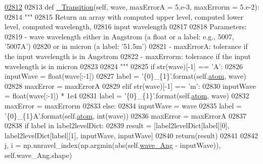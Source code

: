 \begin{DoxyCode}
\hypertarget{classpyneb_1_1core_1_1pynebcore_1_1_rec_atom_l02812}{}\hyperlink{classpyneb_1_1core_1_1pynebcore_1_1_rec_atom_a32b31a371f3b6ecc5bbbc4d0c5d2a855}{02812} 
02813     \textcolor{keyword}{def }\hyperlink{classpyneb_1_1core_1_1pynebcore_1_1_rec_atom_a32b31a371f3b6ecc5bbbc4d0c5d2a855}{\_Transition}(self, wave, maxErrorA = 5.e-3, maxErrorm = 5.e-2):
02814         \textcolor{stringliteral}{"""}
02815 \textcolor{stringliteral}{        Return an array with computed upper level, computed lower level, computed wavelength, }
02816 \textcolor{stringliteral}{            input wavelength}
02817 \textcolor{stringliteral}{        }
02818 \textcolor{stringliteral}{        Parameters:}
02819 \textcolor{stringliteral}{            - wave       wavelength either in Angstrom (a float or a label: e.g., 5007, '5007A') }
02820 \textcolor{stringliteral}{                            or in micron (a label: '51.5m')}
02821 \textcolor{stringliteral}{            - maxErrorA: tolerance if the input wavelength is in Angstrom}
02822 \textcolor{stringliteral}{            - maxErrorm: tolerance if the input wavelength is in micron}
02823 \textcolor{stringliteral}{                            }
02824 \textcolor{stringliteral}{        """}
02825         \textcolor{keywordflow}{if} str(wave)[-1] == \textcolor{stringliteral}{'A'}:
02826             inputWave = float(wave[:-1])
02827             label = \textcolor{stringliteral}{'\{0\}\_\{1\}'}.format(self.\hyperlink{classpyneb_1_1core_1_1pynebcore_1_1_rec_atom_a1a2aa175da6b5b8847f409e37437e3d3}{atom}, wave)
02828             maxError = maxErrorA
02829         \textcolor{keywordflow}{elif} str(wave)[-1] == \textcolor{stringliteral}{'m'}:
02830             inputWave = float(wave[:-1]) * 1e4
02831             label = \textcolor{stringliteral}{'\{0\}\_\{1\}'}.format(self.\hyperlink{classpyneb_1_1core_1_1pynebcore_1_1_rec_atom_a1a2aa175da6b5b8847f409e37437e3d3}{atom}, wave)
02832             maxError = maxErrorm
02833         \textcolor{keywordflow}{else}:
02834             inputWave = wave
02835             label = \textcolor{stringliteral}{'\{0\}\_\{1\}A'}.format(self.\hyperlink{classpyneb_1_1core_1_1pynebcore_1_1_rec_atom_a1a2aa175da6b5b8847f409e37437e3d3}{atom}, int(wave))
02836             maxError = maxErrorA
02837             
02838         \textcolor{keywordflow}{if} label \textcolor{keywordflow}{in} label2levelDict:
02839             result = [label2levelDict[label][0], label2levelDict[label][1], inputWave, inputWave]
02840             return(result)
02841         
02842         j, i = np.unravel\_index(np.argmin(abs(self.\hyperlink{classpyneb_1_1core_1_1pynebcore_1_1_rec_atom_aa2fd61021ea3067af77e7ee0053ace11}{wave\_Ang} - inputWave)), self.wave\_Ang.shape)

\end{DoxyCode}
